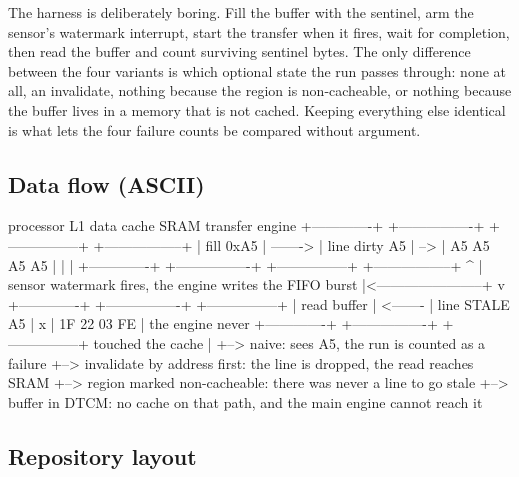 The harness is deliberately boring. Fill the buffer with the sentinel, arm the
sensor's watermark interrupt, start the transfer when it fires, wait for
completion, then read the buffer and count surviving sentinel bytes. The only
difference between the four variants is which optional state the run passes
through: none at all, an invalidate, nothing because the region is
non-cacheable, or nothing because the buffer lives in a memory that is not
cached. Keeping everything else identical is what lets the four failure counts
be compared without argument.

\subsection*{Data flow (ASCII)}

\begin{asciiart}
    processor                 L1 data cache            SRAM                 transfer engine
  +-------------+          +----------------+     +---------------+       +-----------------+
  | fill 0xA5   | -------> | line dirty A5  | --> | A5 A5 A5 A5   |       |                 |
  +-------------+          +----------------+     +---------------+       +-----------------+
                                                          ^                        |
  sensor watermark fires, the engine writes the FIFO burst |<-----------------------+
                                                          v
  +-------------+          +----------------+     +---------------+
  | read buffer | <------- | line STALE A5  |  x  | 1F 22 03 FE   |   the engine never
  +-------------+          +----------------+     +---------------+   touched the cache
        |
        +--> naive: sees A5, the run is counted as a failure
        +--> invalidate by address first: the line is dropped, the read reaches SRAM
        +--> region marked non-cacheable: there was never a line to go stale
        +--> buffer in DTCM: no cache on that path, and the main engine cannot reach it
\end{asciiart}

\subsection*{Repository layout}

